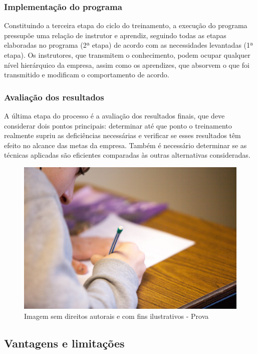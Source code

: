 \documentclass[12pt]{article}
\begin{document}
\subsubsection{Implementação do programa}

Constituindo a terceira etapa do ciclo do treinamento, a execução do programa pressupõe uma relação de instrutor e aprendiz, seguindo todas as etapas elaboradas no programa (2ª etapa) de acordo com as necessidades levantadas (1ª etapa). Os instrutores, que transmitem o conhecimento, podem ocupar qualquer nível hierárquico da empresa, assim como os aprendizes, que absorvem o que foi transmitido e modificam o comportamento de acordo.

\subsubsection{Avaliação dos resultados}

A última etapa do processo é a avaliação dos resultados finais, que deve considerar dois pontos principais: determinar até que ponto o treinamento realmente supriu as deficiências necessárias e verificar se esses resultados têm efeito no alcance das metas da empresa. Também é necessário determinar se as técnicas aplicadas são eficientes comparadas às outras alternativas consideradas.

\begin{figure}[h]
	\centering
	\includegraphics[width=1\textwidth]{build/images/prova}
	\caption{Imagem sem direitos autorais e com fins ilustrativos - Prova}
	\label{fig:mesh1}
\end{figure}


\subsection{Vantagens e limitações}
\end{document}
